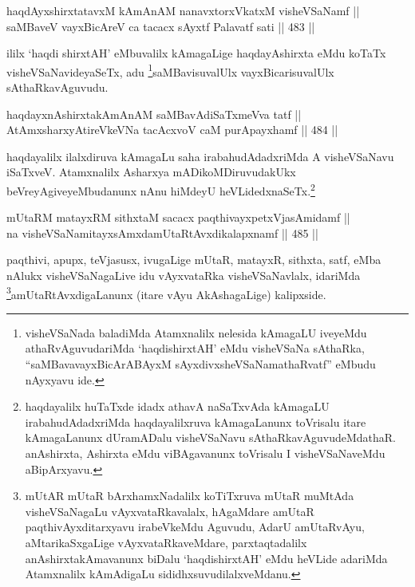 
\begin{shl}
haqdAyxshirxtatavxM kAmAnAM nanavxtorxVkatxM visheVSaNamf || \\
saMBaveV vayxBicAreV ca tacacx sAyxtf Palavatf sati \hfill || 483 ||  
\end{shl}

\begin{artha}		
ililx `haqdi shirxtAH' eMbuvalilx kAmagaLige haqdayAshirxta eMdu
koTaTx visheVSaNavideyaSeTx, adu \footnote{visheVSaNada baladiMda
Atamxnalilx nelesida kAmagaLU iveyeMdu athaRvAguvudariMda
`haqdishirxtAH' eMdu visheVSaNa sAthaRka, ``saMBavavayxBicArABAyxM sAyxdivxsheVSaNamathaRvatf'' eMbudu nAyxyavu ide.}saMBavisuvalUlx vayxBicarisuvalUlx sAthaRkavAguvudu.
\end{artha}

\begin{shl}
haqdayxnAshirxtakAmAnAM saMBavAdiSaTxmeVva tatf || \\
AtAmxsharxyAtireVkeVNa tacAcxvoV caM purA\s payxhamf \hfill || 484 ||  
\end{shl}

\begin{artha}
haqdayalilx ilalxdiruva kAmagaLu saha irabahudAdadxriMda A
visheVSaNavu iSaTxveV. Atamxnalilx Asharxya mADikoMDiruvudakUkx
beVreyAgiveyeMbudanunx nAnu hiMdeyU heVLidedxnaSeTx.\footnote{haqdayalilx huTaTxde idadx athavA naSaTxvAda kAmagaLU
irabahudAdadxriMda haqdayalilxruva kAmagaLanunx toVrisalu itare
kAmagaLanunx dUramADalu visheVSaNavu sAthaRkavAguvudeMdathaR.
anAshirxta, Ashirxta eMdu viBAgavanunx toVrisalu I visheVSaNaveMdu aBipArxyavu.}
\end{artha}


\begin{shl}
mUtaRM matayxRM sithxtaM sacacx paqthivayxpetxVjasAmidamf || \\
na visheVSaNamitayxsAmxdamUtaRtAvxdikalapxnamf \hfill || 485 ||  
\end{shl}

\begin{artha}
paqthivi, apupx, teVjasusx, ivugaLige mUtaR, matayxR, sithxta, satf,
eMba nAlukx visheVSaNagaLive idu vAyxvataRka visheVSaNavlalx,
idariMda \footnote{mUtAR mUtaR bArxhamxNadalilx koTiTxruva mUtaR
muMtAda visheVSaNagaLu vAyxvataRkavalalx, hAgaMdare amUtaR
paqthivAyxditarxyavu irabeVkeMdu Aguvudu, AdarU amUtaRvAyu,
aMtarikaSxgaLige vAyxvataRkaveMdare, parxtaqtadalilx
anAshirxtakAmavanunx biDalu `haqdishirxtAH' eMdu heVLide adariMda
Atamxnalilx kAmAdigaLu sididhxsuvudilalxveMdanu.}amUtaRtAvxdigaLanunx (itare vAyu AkAshagaLige)
kalipxside.
\end{artha}

